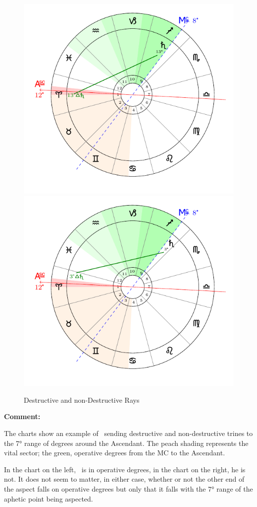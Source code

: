 \begin{figure}[H]
\includegraphics[width=.48\textwidth]{charts/3_03_3a}
\includegraphics[width=.48\textwidth]{charts/3_03_3b}
\caption{Destructive and non-Destructive Rays}
\end{figure}
\newpage
\begin{mdframed}[backgroundcolor=cyan!5]
\textbf{Comment:}

The charts show an example of \Saturn\, sending destructive and non-destructive trines to the 7° range of degrees around the Ascendant. The peach shading represents the vital sector; the green, operative degrees from the MC to the Ascendant.

In the chart on the left, \Saturn\, is in operative degrees, in the chart on the right, he is not. It does not seem to matter, in either case, whether or not the other end of the aspect falls on operative degrees but only that it falls with the 7° range of the aphetic point being aspected.
\end{mdframed}

\newpage
